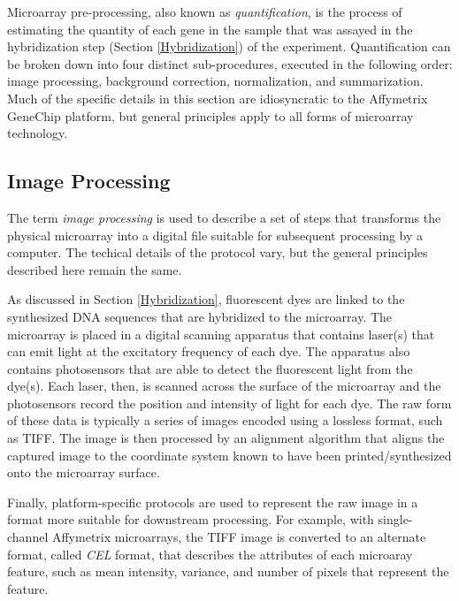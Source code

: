 
Microarray pre-processing, also known as \emph{quantification}, is the process
of estimating the quantity of each gene in the sample that was assayed in the
hybridization step (Section \ref{Hybridization}) of the experiment.
Quantification can be broken down into four distinct sub-procedures, executed
in the following order: image processing, background correction, normalization,
and summarization.  Much of the specific details in this section are
idiosyncratic to the Affymetrix GeneChip platform, but general principles apply
to all forms of microarray technology.

\subsection{Image Processing}\label{Image Processing}

The term \emph{image processing} is used to describe a set of steps that
transforms the physical microarray into a digital file suitable for subsequent
processing by a computer.  The techical details of the protocol vary, but the
general principles described here remain the same.

As discussed in Section \ref{Hybridization}, fluorescent dyes are linked to the
synthesized DNA sequences that are hybridized to the microarray.  The
microarray is placed in a digital scanning apparatus that contains laser(s)
that can emit light at the excitatory frequency of each dye.  The apparatus
also contains photosensors that are able to detect the fluorescent light from
the dye(s).  Each laser, then, is scanned across the surface of the microarray
and the photosensors record the position and intensity of light for each dye.
The raw form of these data is typically a series of images encoded using a
lossless format, such as TIFF.  The image is then processed by an alignment
algorithm that aligns the captured image to the coordinate system known to have
been printed/synthesized onto the microarray surface.

Finally, platform-specific protocols are used to represent the raw image in a
format more suitable for downstream processing.  For example, with
single-channel Affymetrix microarrays, the TIFF image is converted to an
alternate format, called \emph{CEL} format, that describes the attributes of
each microaray feature, such as mean intensity, variance, and number of pixels
that represent the feature.

